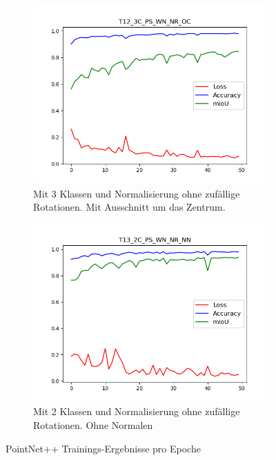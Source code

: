 \documentclass[12pt,titlepage, twoside]{article}
\begin{document}
\begin{figure}
\begin{subfigure}{0.485\textwidth}
  \includegraphics[width=\linewidth]{./Images/T12_3C_PS_WN_NR_OC.png}
  \caption{Mit 3 Klassen und Normalisierung ohne zufällige Rotationen. Mit Ausschnitt um das Zentrum.}
  \label{fig:T12_3C_PS_WN_NR_OC}
\end{subfigure}\hfil 
\begin{subfigure}{0.485\textwidth}
  \includegraphics[width=\linewidth]{./Images/T13_2C_PS_WN_NR_NN.png}
  \caption{Mit 2 Klassen und Normalisierung ohne zufällige Rotationen. Ohne Normalen}
  \label{fig:T13_2C_PS_WN_NR_NN}
\end{subfigure}
\caption{PointNet++ Trainings-Ergebnisse pro Epoche}
\label{fig:segmentation:training:result}
\end{figure}
\end{document}
